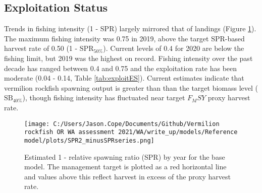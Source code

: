 \documentclass[11pt,
  english,
  a4paper,
]{article}
\begin{document}

\hypertarget{exploitation-status}{%
\subsection*{Exploitation Status}\label{exploitation-status}}

\leavevmode\tagmcend\tagstructend


Trends in fishing intensity (1 - SPR) largely mirrored that of landings (Figure \ref{fig:es-1-spr}). The maximum fishing intensity was 0.75 in 2019, above the target SPR-based harvest rate of 0.50 (1 - {\(\text{SPR}_{50\%}\)\leavevmode\tagmcend\tagstructend}). Current levels of 0.4 for 2020 are below the fishing limit, but 2019 was the highest on record. Fishing intensity over the past decade has ranged between 0.4 and 0.75 and the exploitation rate has been moderate (0.04 - 0.14, Table \ref{tab:exploitES}). Current estimates indicate that vermilion rockfish spawning output is greater than than the target biomass level ({\(\text{SB}_{40\%}\)\leavevmode\tagmcend\tagstructend}), though fishing intensity has fluctuated near target {\(F_MSY\)\leavevmode\tagmcend\tagstructend} proxy harvest rate.

\leavevmode\tagmcend\tagstructend\par




\begin{figure}
\centering
\texttt{[image: C:/Users/Jason.Cope/Documents/Github/Vermilion rockfish OR WA assessment 2021/WA/write\_up/models/Reference model/plots/SPR2\_minusSPRseries.png]}
\caption{Estimated 1 - relative spawning ratio (SPR) by year for the base model. The management target is plotted as a red horizontal line and values above this reflect harvest in excess of the proxy harvest rate.\label{fig:es-1-spr}}
\end{figure}
\end{document}
